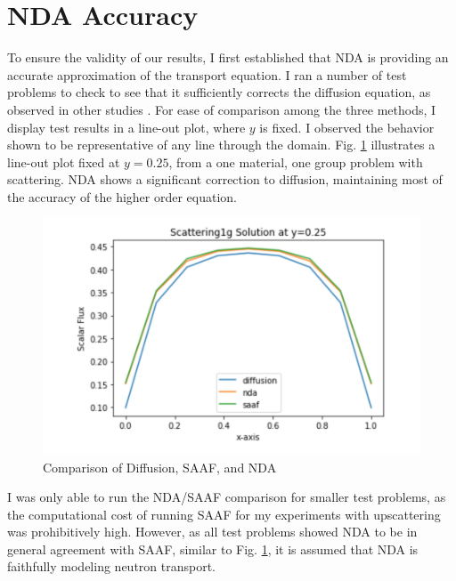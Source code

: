 \section{NDA Accuracy}

To ensure the validity of our results, I first established that NDA is providing an accurate approximation of the transport equation. I ran a number of test problems to check to see that it sufficiently corrects the diffusion equation, as observed in other studies \cite{morel-holo, Wang2013}. For ease of comparison among the three methods, I display test results in a line-out plot, where $y$ is fixed. I observed the behavior shown to be representative of any line through the domain. Fig. \ref{fig:comparison} illustrates a line-out plot fixed at $y=0.25$, from a one material, one group problem with scattering. NDA shows a significant correction to diffusion, maintaining most of the accuracy of the higher order equation. 
\begin{figure}[H]
    \centering
    \includegraphics[width=.75\textwidth]{fig/LineOut25.png}
    \caption{Comparison of Diffusion, SAAF, and NDA}
    \label{fig:comparison}
\end{figure}

I was only able to run the NDA/SAAF comparison for smaller test problems, as the computational cost of running SAAF for my experiments with upscattering was prohibitively high.  However, as all test problems showed NDA to be in general agreement with SAAF, similar to Fig. \ref{fig:comparison}, it is assumed that NDA is faithfully modeling neutron transport. 


